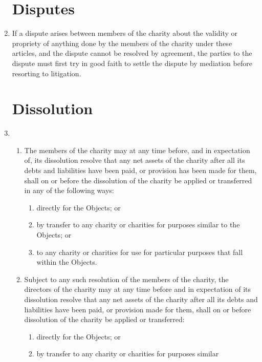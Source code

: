\documentclass{article}
\begin{document}
\begin{enumerate}[label=\arabic*, start=23]
    \section{Disputes}
    \item If a dispute arises between members of the charity about the validity
    or propriety of anything done by the members of the charity under
    these articles, and the dispute cannot be resolved by agreement, the
    parties to the dispute must first try in good faith to settle the dispute by
    mediation before resorting to litigation.
    
    \section{Dissolution}
    \item \begin{enumerate}[label=(\arabic*)]
        \item The members of the charity may at any time before, and in
        expectation of, its dissolution resolve that any net assets of
        the charity after all its debts and liabilities have been paid,
        or provision has been made for them, shall on or before the
        dissolution of the charity be applied or transferred in any of the
        following ways:
        \begin{enumerate}[label=(\alph*)]
            \item directly for the Objects; or
            \item by transfer to any charity or charities for purposes similar
            to the Objects; or
            \item to any charity or charities for use for particular purposes
            that fall within the Objects.
        \end{enumerate}
        \item Subject to any such resolution of the members of the charity,
        the directors of the charity may at any time before and in
        expectation of its dissolution resolve that any net assets of
        the charity after all its debts and liabilities have been paid, or
        provision made for them, shall on or before dissolution of the
        charity be applied or transferred:
        \begin{enumerate}[label=(\alph*)]
            \item directly for the Objects; or
            \item by transfer to any charity or charities for purposes similar

\end{enumerate}
\end{enumerate}
\end{enumerate}
\end{document}
